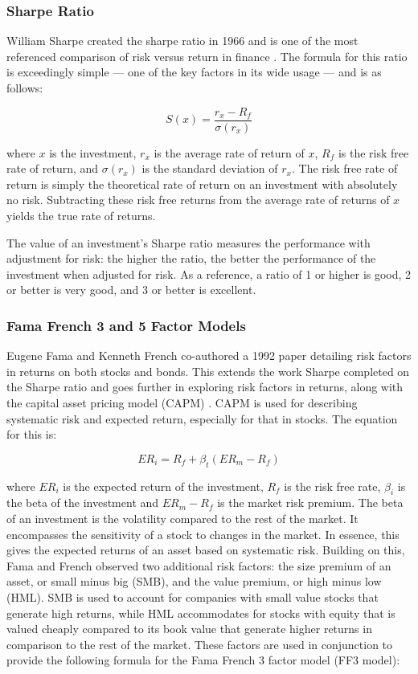 \subsubsection{Sharpe Ratio}
\label{ssub:sharpe-ratio}
William Sharpe created the sharpe ratio in 1966 and is one of the most referenced comparison of risk versus return in finance \parencite{sharpe-ratio}. The formula for this ratio is exceedingly simple --- one of the key factors in its wide usage --- and is as follows:

\begin{equation*}
S(x) = \frac{r_x - R_f}{\sigma(r_x)}
\end{equation*}

\noindent
where $x$ is the investment, $r_x$ is the average rate of return of $x$, $R_f$ is the risk free rate of return, and $\sigma(r_x)$ is the standard deviation of $r_x$. The risk free rate of return is simply the theoretical rate of return on an investment with absolutely no risk. Subtracting these risk free returns from the average rate of returns of $x$ yields the true rate of returns.

The value of an investment's Sharpe ratio measures the performance with adjustment for risk: the higher the ratio, the better the performance of the investment when adjusted for risk. As a reference, a ratio of 1 or higher is good, 2 or better is very good, and 3 or better is excellent. 

\subsubsection{Fama French 3 and 5 Factor Models}
\label{ssub:fama-french}
Eugene Fama and Kenneth French co-authored a 1992 paper detailing risk factors in returns on both stocks and bonds. This extends the work Sharpe completed on the Sharpe ratio and goes further in exploring risk factors in returns, along with the capital asset pricing model (CAPM) \parencite{ff3}. CAPM is used for describing systematic risk and expected return, especially for that in stocks. The equation for this is:

\begin{equation}
ER_i = R_f + \beta_t (ER_m - R_f)
\end{equation}

\noindent
where $ER_i$ is the expected return of the investment, $R_f$ is the risk free rate, $\beta_i$ is the beta of the investment and $ER_m - R_f$ is the market risk premium. The beta of an investment is the volatility compared to the rest of the market. It encompasses the sensitivity of a stock to changes in the market. In essence, this gives the expected returns of an asset based on systematic risk. Building on this, Fama and French observed two additional risk factors: the size premium of an asset, or small minus big (SMB), and the value premium, or high minus low (HML). SMB is used to account for companies with small value stocks that generate high returns, while HML accommodates for stocks with equity that is valued cheaply compared to its book value that generate higher returns in comparison to the rest of the market. These factors are used in conjunction to provide the following formula for the Fama French 3 factor model (FF3 model):

